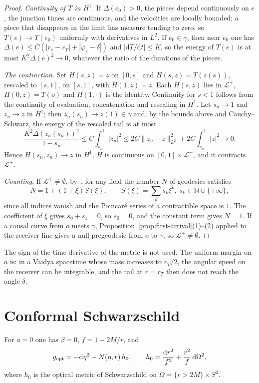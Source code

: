 \documentclass[aip,jmp,amsmath,amssymb,reprint]{revtex4-2}
\newcommand{\dd}{\mathrm{d}}
\newcommand{\gopt}{g_{\rm opt}}
\theoremstyle{plain}
\theoremstyle{definition}
\begin{document}
\begin{proof}
\emph{Continuity of $T$ in $H^1$.} If $\Delta(e_0)>0$, the pieces depend continuously on $e$, the
junction times are continuous, and the velocities are locally bounded; a piece that disappears
in the limit has measure tending to zero, so $T(e)\to T(e_0)$ uniformly with derivatives in $L^2$.
If $e_0\in\gamma$, then near $e_0$ one has $\Delta(e)\le C(|r_e-r_T|+|\varphi_e-\delta|)$ and $|\dd T/\dd t|\le K$, so
the energy of $T(e)$ is at most $K^2\Delta(e)^2\to0$, whatever the ratio of the durations of the
pieces.

\emph{The contraction.} Set $H(s,z)=z$ on $[0,s]$ and $H(s,z)=T(z(s))$, rescaled to $[s,1]$, on
$[s,1]$, with $H(1,z)=z$. Each $H(s,z)$ lies in $\mathcal L^+$, $H(0,z)=T(o)$ and $H(1,\cdot)$ is the
identity. Continuity for $s<1$ follows from the continuity of evaluation, concatenation and
rescaling in $H^1$. Let $s_n\to1$ and $z_n\to z$ in $H^1$; then $z_n(s_n)\to z(1)\in\gamma$ and, by the
bounds above and Cauchy--Schwarz, the energy of the rescaled tail is at most
\[
  \frac{K^2\Delta(z_n(s_n))^2}{1-s_n}\le C\int_{s_n}^1|\dot z_n|^2
  \le 2C\|\dot z_n-\dot z\|_{L^2}^2+2C\int_{s_n}^1|\dot z|^2\to0 .
\]
Hence $H(s_n,z_n)\to z$ in $H^1$, $H$ is continuous on $[0,1]\times\mathcal L^+$, and it contracts $\mathcal L^+$.

\emph{Counting.} If $\mathcal L^+\ne\emptyset$, by~\cite[Theorem~1.7]{GiannoniMasielloPiccioneMorse}, for any field the
number $N$ of geodesics satisfies
\[
  N=1+(1+\xi)S(\xi),\qquad S(\xi)=\sum_ks_k\xi^k,\ s_k\in\mathbb N\cup\{+\infty\},
\]
since all indices vanish and the Poincar\'e series of a contractible space is $1$. The coefficient
of $\xi$ gives $s_0+s_1=0$, so $s_0=0$, and the constant term gives $N=1$. If a causal curve from $o$
meets $\gamma$, Proposition~\ref{prop:first-arrival}(1)--(2) applied to the receiver line gives a null
pregeodesic from $o$ to $\gamma$, so $\mathcal L^+\neq\emptyset$.
\end{proof}

The sign of the time derivative of the metric is not used. The uniform margin on $a$ is: in a
Vaidya spacetime whose mass increases to $r_T/2$, the angular speed on the receiver can be
integrable, and the tail at $r=r_T$ then does not reach the angle $\delta$.

\section{Conformal Schwarzschild}
\label{sec:schw}
For $a=0$ one has $\beta=0$, $f=1-2M/r$, and
\begin{equation}
  \gopt=-\dd\eta^2+N(\eta,r)\,h_0,\qquad
  h_0=\frac{\dd r^2}{f^2}+\frac{r^2}{f}\,\dd\Omega^2 ,
  \label{eq:gopt-schw}
\end{equation}
where $h_0$ is the optical metric of Schwarzschild on $\Omega=\{r>2M\}\times S^2$.
\end{document}
